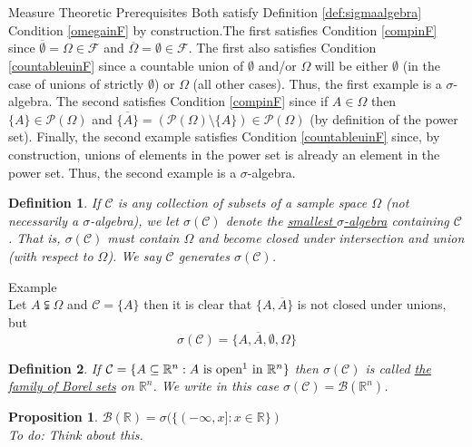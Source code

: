 \documentclass[12pt]{article}
\newtheorem{definition}{Definition}
\newtheorem{proposition}{Proposition}
\begin{document}
\begin{section}{Measure Theoretic Prerequisites}
Both satisfy Definition \ref{def:sigmaalgebra} Condition \ref{omegainF} by construction.The first satisfies Condition \ref{compinF} since $\overline{\emptyset} = \Omega \in \mathcal F$ and $\overline{\Omega} = \emptyset \in \mathcal F$. The first also satisfies Condition \ref{countableuinF} since a countable union of $\emptyset$ and/or $\Omega$ will be either $\emptyset$ (in the case of unions of strictly $\emptyset$) or $\Omega$ (all other cases). Thus, the first example is a $\sigma$-algebra. The second satisfies Condition \ref{compinF} since if $A \in \Omega$ then $\{A\} \in \mathcal P(\Omega)$ and $\overline{\{A\}} = (\mathcal P(\Omega) \setminus \{A\}) \in \mathcal P(\Omega)$  (by definition of the power set). Finally, the second example satisfies Condition \ref{countableuinF} since, by construction, unions of elements in the power set is already an element in the power set. Thus, the second example is a $\sigma$-algebra.

\begin{definition} \label{def:smallsigma} If $\mathcal C$ is any collection of subsets of a sample space $\Omega$ (not necessarily a $\sigma$-algebra), we let $\sigma(\mathcal C)$ denote the \underline{smallest $\sigma$-algebra} containing $\mathcal C$. That is, $\sigma(\mathcal C)$ must contain $\Omega$ and become closed under intersection and union (with respect to $\Omega$). We say $\mathcal C$ generates $\sigma(\mathcal C)$.
\end{definition}

\noindent Example \\
Let $A \subsetneqq \Omega$ and $\mathcal C = \{A\}$ then it is clear that $\{A, \overline{A}\}$ is not closed under unions, but
\begin{equation*}
	\sigma(\mathcal C) = \{A, \overline{A}, \emptyset, \Omega\}
\end{equation*}

\begin{definition} \label{def:borelsets} If $\mathcal C = \{A \subseteq \mathbb R^n : A \text{ is open\footnotemark~in } \mathbb R^n\}$ then $\sigma(\mathcal C)$ is called \underline{the family of Borel sets} on $\mathbb R^n$. We write in this case $\sigma(\mathcal C) = \mathcal B(\mathbb R^n)$.
\end{definition}

\begin{proposition} $\mathcal B(\mathbb R) = \sigma(\{(-\infty, x] : x \in \mathbb R\})$ \\
To do: Think about this.
\end{proposition}


\end{section}
\end{document}
